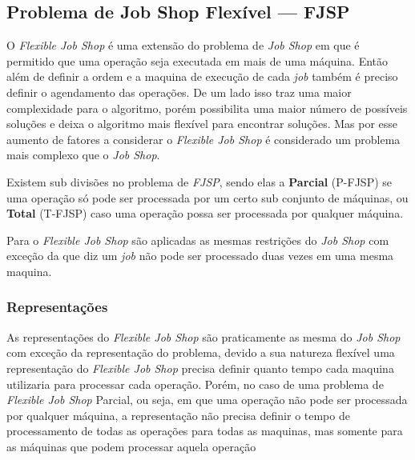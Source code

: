 


    \subsection{Problema de Job Shop Flexível — FJSP}
            O \textit{Flexible Job Shop} é uma extensão do problema de \textit{Job Shop} em que é permitido que uma operação seja executada em mais de uma máquina. Então além de definir a ordem e a maquina de execução de cada \textit{job} também é preciso definir o agendamento das operações.\newline 
            De um lado isso traz uma maior complexidade para o algoritmo, porém possibilita uma maior número de possíveis soluções e deixa o algoritmo mais flexível para encontrar soluções. Mas por esse aumento de fatores a considerar o \textit{Flexible Job Shop} é considerado um problema mais complexo que o \textit{Job Shop}.\newline

            Existem sub divisões no problema de \textit{FJSP}, sendo elas a \textbf{Parcial} (P-FJSP) se uma operação só pode ser processada por um certo sub conjunto de máquinas, ou \textbf{Total} (T-FJSP) caso uma operação possa ser processada por qualquer máquina.\newline

            Para o \textit{Flexible Job Shop} são aplicadas as mesmas restrições do \textit{Job Shop} com exceção da que diz um \textit{job} não pode ser processado duas vezes em uma mesma maquina.\newline

        \subsubsection{Representações}
            As representações do \textit{Flexible Job Shop} são praticamente as mesma do \textit{Job Shop} com exceção da representação do problema, devido a sua natureza flexível uma representação do \textit{Flexible Job Shop} precisa definir quanto tempo cada maquina utilizaria para processar cada operação. Porém, no caso de uma problema de \textit{Flexible Job Shop} Parcial, ou seja, em que uma operação não pode ser processada por qualquer máquina, a representação não precisa definir o tempo de processamento de todas as operações para todas as maquinas, mas somente para as máquinas que podem processar aquela operação


